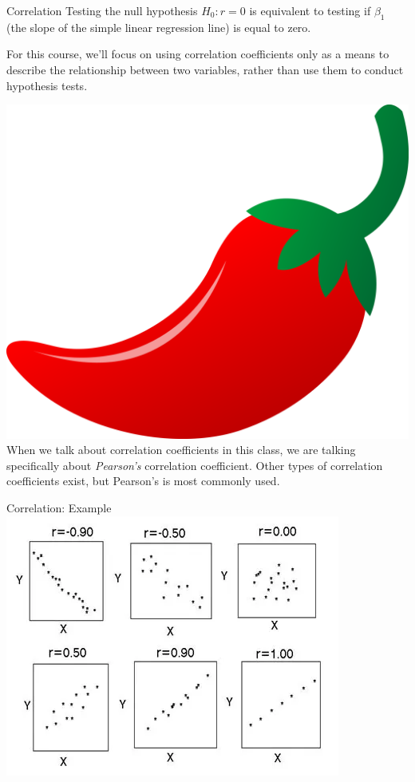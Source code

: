\documentclass[10pt,t]{beamer}
\begin{document}
\begin{frame}{Correlation}
Testing the null hypothesis $H_0: r = 0$ is equivalent to testing if $\beta_1$ (the slope of the simple linear regression line) is equal to zero. 

\vspace{0.3cm}

For this course, we'll focus on using correlation coefficients only as a means to describe the relationship between two variables, rather than use them to conduct hypothesis tests.

\vspace{0.3cm}

\includegraphics[scale=0.01]{chilipepper.png} When we talk about correlation coefficients in this class, we are talking specifically about \textit{Pearson's} correlation coefficient. Other types of correlation coefficients exist, but Pearson's is most commonly used.
\end{frame}

\begin{frame}{Correlation: Example}
\centering \includegraphics[scale=0.5]{correlation.png}
\end{frame}
\end{document}
